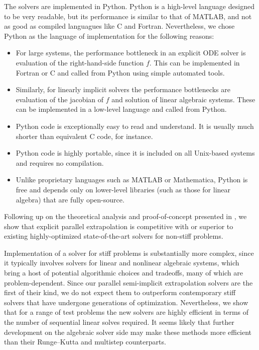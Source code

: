 \documentclass[12pt]{article}
\begin{document}
The solvers are implemented in Python.  Python is
a high-level language designed to be very readable,
but its performance is similar to that of MATLAB, and not as good as compiled languagues
like C and Fortran.
Nevertheless, we chose Python
as the language of implementation for the following
reasons:
\begin{itemize}
	\item For large systems, the performance bottleneck 
    		in an explicit ODE solver
    		is evaluation of the right-hand-side function $f$.
            This can be implemented in Fortran or C and 
            called from Python using simple automated tools.
	\item Similarly, for linearly implicit solvers the performance
    		bottlenecks are evaluation of the  jacobian of 
            $f$ and solution of linear algebraic systems.
            These can be implemented in a low-level language
            and called from Python.
     \item Python code is exceptionally easy to read and understand.
     		It is usually much shorter than equivalent C code,
            for instance.
     \item Python code is highly portable, since it is included
     		on all Unix-based systems and requires no compilation.
     \item Unlike proprietary languages such as MATLAB or
     		Mathematica, Python
     		is free and depends only on lower-level libraries 
            (such as those for linear algebra) that are fully
            open-source.
\end{itemize}

Following up on the theoretical analysis and proof-of-concept
presented in \cite{2014_hork}, we
show that explicit parallel extrapolation is competitive
with or superior to existing highly-optimized
state-of-the-art solvers for non-stiff problems.

Implementation of a solver for stiff problems is substantially
more complex, since it typically involves solvers for
linear and nonlinear algebraic systems, which bring a
host of potential algorithmic choices and tradeoffs, many
of which are problem-dependent.  Since our parallel
semi-implicit extrapolation solvers are the first of their
kind, we do not expect them to outperform contemporary
stiff solvers that have undergone generations of optimization.
Nevertheless, we show that for a range of test problems
the new solvers are highly efficient in terms of the number
of sequential linear solves required.  It seems likely
that further development on the algebraic solver side may
make these methods more efficient than their Runge--Kutta
and multistep counterparts.
\end{document}
